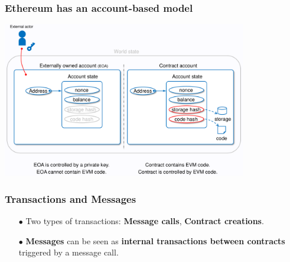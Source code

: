 \documentclass{beamer}
\begin{document}
\begin{frame}
	\frametitle{Ethereum has an account-based model}
	\includegraphics[width=0.8\textwidth, center]{../images/accounts}
	
\end{frame}

\begin{frame}
	\frametitle{Transactions and Messages}
	\begin{itemize}
		\item[$\bullet$] Two types of transactions: \textbf{Message calls}, \textbf{Contract creations}. \linebreak
		\item[$\bullet$] \textbf{Messages} can be seen as \textbf{internal transactions between contracts} triggered by a message call.
	\end{itemize}
\end{frame}
\end{document}
